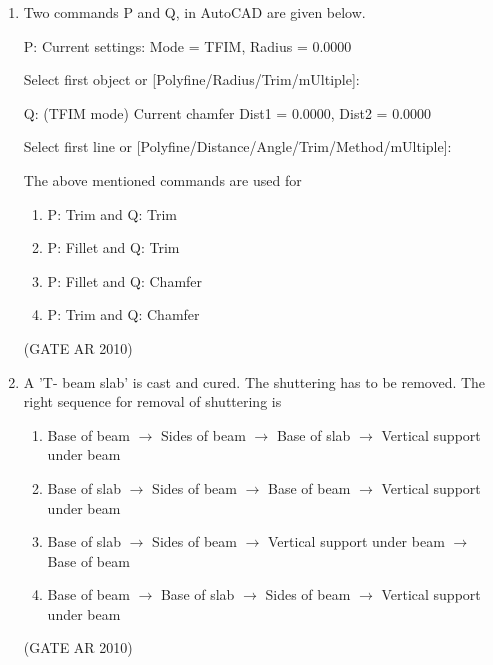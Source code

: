 \documentclass[journal]{IEEEtran}
\begin{document}
\begin{enumerate}
V - Transport Plan

W - Drainage / Sewerage/ Water Supply Plan

X - Solid waste disposal plan
\begin{multicols}{4}
\begin{enumerate}
\item P, Q, R, S, W
\item P, Q, S, U, W
\item P, S, V, W, X
\item Q, S, T, V, X
\end{enumerate}
\end{multicols}
\hfill (GATE AR 2010)

\item Two commands P and Q, in AutoCAD are given below.

P: Current settings: Mode = TFIM, Radius = 0.0000

Select first object or [Polyfine/Radius/Trim/mUltiple]:

Q: (TFIM mode) Current chamfer Dist1 = 0.0000, Dist2 = 0.0000

Select first line or [Polyfine/Distance/Angle/Trim/Method/mUltiple]:

The above mentioned commands are used for
\begin{multicols}{2}
\begin{enumerate}
\item P: Trim and Q: Trim
\item P: Fillet and Q: Trim
\item P: Fillet and Q: Chamfer
\item P: Trim and Q: Chamfer
\end{enumerate}
\end{multicols}
\hfill (GATE AR 2010)

\item A 'T- beam slab' is cast and cured. The shuttering has to be removed. The right sequence for removal of shuttering is
\begin{enumerate}
\item Base of beam $\rightarrow$ Sides of beam $\rightarrow$ Base of slab $\rightarrow$ Vertical support under beam
\item Base of slab $\rightarrow$ Sides of beam $\rightarrow$ Base of beam $\rightarrow$ Vertical support under beam
\item Base of slab $\rightarrow$ Sides of beam $\rightarrow$ Vertical support under beam $\rightarrow$ Base of beam
\item Base of beam $\rightarrow$ Base of slab $\rightarrow$ Sides of beam $\rightarrow$ Vertical support under beam
\end{enumerate}
\hfill (GATE AR 2010)


\end{enumerate}
\end{document}
